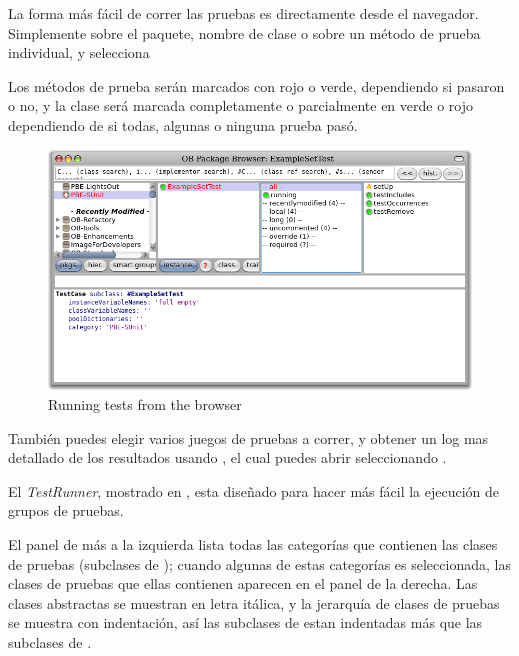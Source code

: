 \documentclass[a4paper,10pt,twoside]{book}
\begin{document}
La forma m\'as f\'acil de correr las pruebas es directamente desde el navegador.
Simplemente \actclick sobre el paquete, nombre de clase o sobre un m\'etodo de prueba individual, 
y selecciona 

Los m\'etodos de prueba ser\'an marcados con rojo o verde, dependiendo si pasaron o no, y la clase ser\'a marcada completamente o parcialmente en verde o rojo dependiendo de si todas, algunas o ninguna prueba pas\'o.

\begin{figure}[tbh]
  \begin{center}
	\includegraphics[width=\linewidth]{browser-tests}
	\caption{Running \sunit tests from the browser}
  \end{center}
\end{figure}

Tambi\'en puedes elegir varios juegos de pruebas a correr, y obtener un log mas detallado de los resultados
usando \sunit {}, el cual puedes abrir seleccionando .


El \emph{TestRunner}, mostrado en , esta dise\~nado para hacer m\'as
f\'acil la ejecuci\'on de grupos de pruebas.

El panel de m\'as a la izquierda lista todas las categor\'ias que contienen las clases de pruebas
(\ie subclases de ); cuando algunas de estas categor\'ias es seleccionada, las clases de pruebas
que ellas contienen aparecen en el panel de la derecha.
Las clases abstractas se muestran en letra it\'alica, y la jerarqu\'ia de clases de pruebas se muestra con indentaci\'on, as\'i las subclases de  estan indentadas m\'as que las subclases de .
\end{document}
